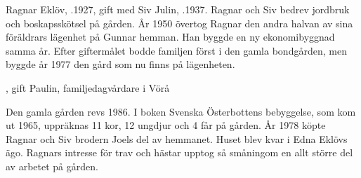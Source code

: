 
%
Ragnar Eklöv, .1927, gift med Siv Julin, .1937. Ragnar och Siv bedrev jordbruk och boskapsskötsel på gården. År 1950 övertog Ragnar den andra halvan av sina föräldrars lägenhet på Gunnar hemman. Han byggde en ny ekonomibyggnad samma år. Efter giftermålet bodde familjen först i den gamla bondgården, men byggde år 1977 den gård som nu finns på lägenheten.
\begin{jhchildren}
  \item {}
  \item {}
  \item {}, gift Paulin, familjedagvårdare i Vörå
\end{jhchildren}

Den gamla gården revs 1986. I boken Svenska Österbottens bebyggelse, som  kom ut 1965, uppräknas 11 kor, 12 ungdjur och 4 får på gården. År 1978 köpte Ragnar och Siv brodern Joels del av hemmanet. Huset blev kvar i Edna Eklövs ägo. Ragnars intresse för trav och hästar upptog så småningom en allt större del av arbetet på gården.


